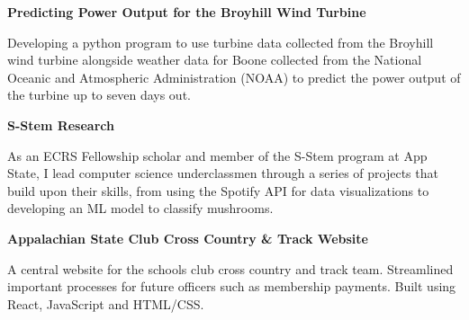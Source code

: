 
\begin{cventries}

  \cventry
    {\textbf{Predicting Power Output for the Broyhill Wind Turbine}} %
    {} %
    {} %
    {}
    {
      \begin{cvitems} %
        \item {Developing a python program to use turbine data collected from the Broyhill wind turbine alongside weather data for Boone collected from the National Oceanic and Atmospheric Administration (NOAA) to predict the power output of the turbine up to seven days out.}
      \end{cvitems}
    }

  \cventry
    {\textbf{S-Stem Research}} %
    {} %
    {} %
    {} %
    {
      \begin{cvitems} %
        \item {As an ECRS Fellowship scholar and member of the S-Stem program at App State, I lead computer science underclassmen through a series of projects that build upon their skills, from using the Spotify API for data visualizations to developing an ML model to classify mushrooms.}
      \end{cvitems}
    }

   \cventry
    {\textbf{Appalachian State Club Cross Country \& Track Website}} %
    {} %
    {} %
    {} %
    {
      \begin{cvitems} %
        \item {A central website for the schools club cross country and track team. Streamlined important processes for future officers such as membership payments. Built using React, JavaScript and HTML/CSS.}
      \end{cvitems}
     }


\end{cventries}
